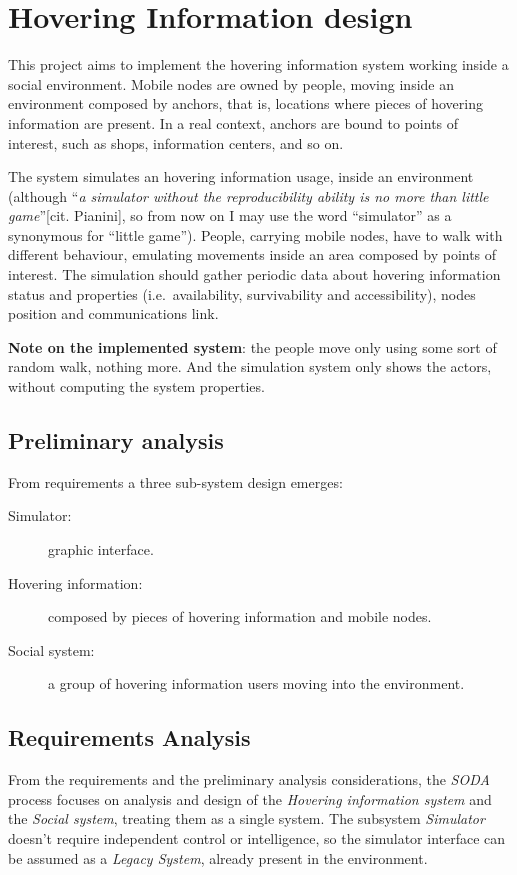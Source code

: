 \section{Hovering Information design}
\label{sec:design}

This project aims to implement the hovering information system working inside
a social environment. Mobile nodes are owned by people, moving inside an
environment composed by anchors, that is, locations where pieces of hovering
information are present. In a real context, anchors are bound to points of
interest, such as shops, information centers, and so on.

The system simulates an hovering information usage, inside an environment
(although ``\emph{a simulator without the reproducibility ability is no more
than little game}''[cit. Pianini], so from now on I may use the word
``simulator'' as a synonymous for ``little game''). People, carrying mobile
nodes, have to walk with different behaviour, emulating movements inside an
area composed by points of interest.  The simulation should gather periodic
data about hovering information status and properties (i.e.\ availability,
survivability and accessibility), nodes position and communications link.

\textbf{Note on the implemented system}: the people move only using some sort of random
walk, nothing more. And the simulation system only shows the actors, without
computing the system properties.

\subsection{Preliminary analysis}

From requirements a three sub-system design emerges:
\begin{description}
	\item[Simulator:] graphic interface.
	\item[Hovering information:] composed by pieces of hovering information and
		mobile nodes.
	\item[Social system:] a group of hovering information users moving into
		the environment.
\end{description}

\subsection{Requirements Analysis}

From the requirements and the preliminary analysis considerations, the
\emph{SODA} process focuses on analysis and design of the \emph{Hovering
information system} and the \emph{Social system}, treating them as a single
system. The subsystem \emph{Simulator} doesn't require independent control or
intelligence, so the simulator interface can be assumed as a \emph{Legacy
System}, already present in the environment.

